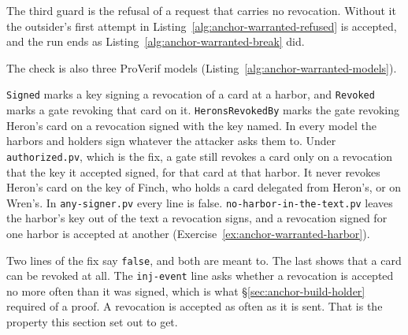
The third guard is the refusal of a request that carries no revocation.
Without it the outsider's first attempt in
Listing~\ref{alg:anchor-warranted-refused} is accepted, and the run
ends as Listing~\ref{alg:anchor-warranted-break} did.

The check is also three ProVerif models
(Listing~\ref{alg:anchor-warranted-models}).


\texttt{Signed} marks a key signing a revocation of a card at a harbor, and
\texttt{Revoked} marks a gate revoking that card on it.
\texttt{HeronsRevokedBy} marks the gate revoking Heron's card on a
revocation signed with the key named. In every model
the harbors and holders sign whatever the attacker asks them to. Under
\texttt{authorized.pv}, which is the fix, a gate still revokes a card
only on a revocation that the key it accepted signed, for that card at that
harbor. It never revokes Heron's card on the key of Finch, who holds
a card delegated from Heron's, or on Wren's. In \texttt{any-signer.pv} every
line is false. \texttt{no-harbor-in-the-text.pv} leaves the harbor's key out
of the text a revocation signs, and a revocation signed for one harbor is
accepted at another (Exercise~\ref{ex:anchor-warranted-harbor}).

Two lines of the fix say \texttt{false}, and both are meant to. The last
shows that a card can be revoked at all. The \texttt{inj-event} line asks
whether a revocation is accepted no more often than it was signed, which is
what \S\ref{sec:anchor-build-holder} required of a proof. A revocation is
accepted as often as it is sent. That is the property this section set out
to get.


